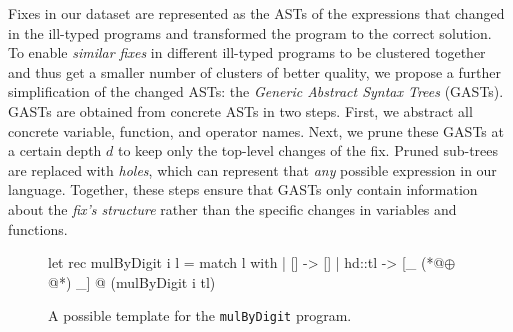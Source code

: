 

%
Fixes in our dataset are represented as the ASTs of 
the expressions that changed in the ill-typed programs 
and transformed the program to the correct solution.
%
To enable \emph{similar fixes} in different ill-typed 
programs to be clustered together and thus get a smaller 
number of clusters of better quality, we propose a 
further simplification of the changed ASTs: the 
\emph{Generic Abstract Syntax Trees} (GASTs). 
%
GASTs are obtained from concrete ASTs in two steps.
%
First, we abstract all concrete variable, function, 
and operator names. 
%
Next, we prune these GASTs at a certain depth $d$ 
to keep only the top-level changes of the fix. 
Pruned sub-trees are replaced with \emph{holes}, 
which can represent that \emph{any} possible 
expression in our language.
%
Together, these steps ensure that GASTs only contain 
information about the \emph{fix's structure} rather 
than the specific changes in variables and functions. 







\begin{figure}[ht]
\begin{ecode}
let rec mulByDigit i l =
  match l with
  | []     -> []
  | hd::tl -> [_ (*@$\oplus$@*) _] @ (mulByDigit i tl)
\end{ecode}
\caption{A possible template for the \texttt{mulByDigit} program.}
\label{fig:suggestion}
\end{figure}

